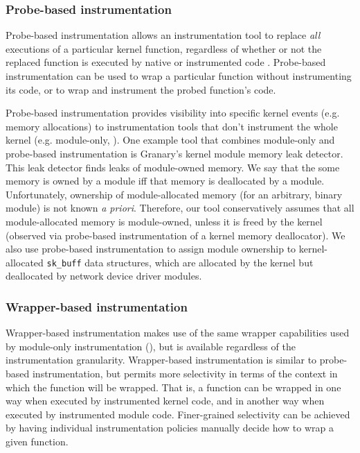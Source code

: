 \documentclass[preprint]{sigplanconf}
\begin{document}
\subsubsection{Probe-based instrumentation}

Probe-based instrumentation allows an instrumentation tool to replace \emph{all} executions of a particular kernel function, regardless of whether or not the replaced function is executed by native or instrumented code \cite{KProbes, AnyWhereAnyTimeDBT, KernInst}. Probe-based instrumentation can be used to wrap a particular function without instrumenting its code, or to wrap and instrument the probed function's code.

Probe-based instrumentation provides visibility into specific kernel events (e.g. memory allocations) to instrumentation tools that don't instrument the whole kernel (e.g. module-only, ). One example tool that combines module-only and probe-based instrumentation is Granary's kernel module memory leak detector. This leak detector finds leaks of module-owned memory. We say that the some memory is owned by a module iff that memory is deallocated by a module. Unfortunately, ownership of module-allocated memory (for an arbitrary, binary module) is not known \emph{a priori}. Therefore, our tool conservatively assumes that all module-allocated memory is module-owned, unless it is freed by the kernel (observed via probe-based instrumentation of a kernel memory deallocator). We also use probe-based instrumentation to assign module ownership to kernel-allocated \texttt{sk\_buff} data structures, which are allocated by the kernel but deallocated by network device driver modules.

\subsubsection{Wrapper-based instrumentation}

Wrapper-based instrumentation makes use of the same wrapper capabilities used by module-only instrumentation (), but is available regardless of the instrumentation granularity. Wrapper-based instrumentation is similar to probe-based instrumentation, but permits more selectivity in terms of the context in which the function will be wrapped. That is, a function can be wrapped in one way when executed by instrumented kernel code, and in another way when executed by instrumented module code. Finer-grained selectivity can be achieved by having individual instrumentation policies manually decide how to wrap a given function.
\end{document}
